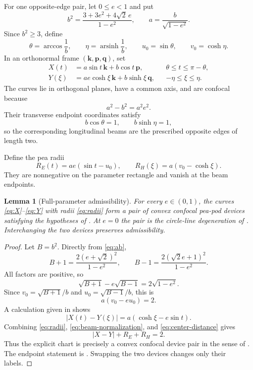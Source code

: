 \documentclass[11pt]{article}
\numberwithin{equation}{section}
\newtheorem{lemma}[theorem]{Lemma}
\theoremstyle{remark}
\newcommand{\arsinh}{\operatorname{arsinh}}
\begin{document}
For one opposite-edge pair, let \(0\le e<1\) and put
\begin{equation}
  b^2=\frac{3+3e^2+4\sqrt2\,e}{1-e^2},
  \qquad
  a=\frac b{\sqrt{1-e^2}}.
  \label{eq:ab}
\end{equation}
Since \(b^2\ge3\), define
\[
  \theta=\arccos\frac1b,
  \qquad
  \eta=\arsinh\frac1b,
  \qquad
  u_0=\sin\theta,
  \qquad
  v_0=\cosh\eta.
\]
In an orthonormal frame \((\mathbf k,\mathbf p,\mathbf q)\), set
\begin{align}
  X(t)&=a\sin t\,\mathbf k+b\cos t\,\mathbf p,
  &&\theta\le t\le\pi-\theta,\label{eq:X}\\
  Y(\xi)&=ae\cosh\xi\,\mathbf k+b\sinh\xi\,\mathbf q,
  &&-\eta\le\xi\le\eta.\label{eq:Y}
\end{align}
The curves lie in orthogonal planes, have a common axis, and are confocal because
\[
  a^2-b^2=a^2e^2.
\]
Their transverse endpoint coordinates satisfy
\[
  b\cos\theta=1,
  \qquad
  b\sinh\eta=1,
\]
so the corresponding longitudinal beams are the prescribed opposite edges of length two.

Define the pea radii
\begin{equation}
  R_E(t)=ae(\sin t-u_0),
  \qquad
  R_H(\xi)=a(v_0-\cosh\xi).
  \label{eq:radii}
\end{equation}
They are nonnegative on the parameter rectangle and vanish at the beam endpoints.

\begin{lemma}[Full-parameter admissibility]
\label{lem:admissible}
For every \(e\in(0,1)\), the curves \eqref{eq:X}--\eqref{eq:Y} with radii \eqref{eq:radii} form a pair of convex confocal pea-pod devices satisfying the hypotheses of \cite[Theorem~4.5]{ArelioMontejanoOliveros2023}.  At \(e=0\) the pair is the circle-line degeneration of \cite[Section~5.3]{ArelioMontejanoOliveros2023}.  Interchanging the two devices preserves admissibility.
\end{lemma}

\begin{proof}
Let \(B=b^2\).  Directly from \eqref{eq:ab},
\[
  B+1=\frac{2(e+\sqrt2)^2}{1-e^2},
  \qquad
  B-1=\frac{2(\sqrt2e+1)^2}{1-e^2}.
\]
All factors are positive, so
\[
  \sqrt{B+1}-e\sqrt{B-1}=2\sqrt{1-e^2}.
\]
Since \(v_0=\sqrt{B+1}/b\) and \(u_0=\sqrt{B-1}/b\), this is
\begin{equation}
  a(v_0-eu_0)=2.
  \label{eq:beam-normalization}
\end{equation}
A calculation given in  shows
\begin{equation}
  |X(t)-Y(\xi)|=a(\cosh\xi-e\sin t).
  \label{eq:center-distance}
\end{equation}
Combining \eqref{eq:radii}, \eqref{eq:beam-normalization}, and \eqref{eq:center-distance} gives
\begin{equation}
  |X-Y|+R_E+R_H=2.
  \label{eq:local-width}
\end{equation}
Thus the explicit chart is precisely a convex confocal device pair in the sense of \cite[Definition~3.5 and Theorem~3.3]{ArelioMontejanoOliveros2023}.  The endpoint statement is \cite[Section~5.3]{ArelioMontejanoOliveros2023}.  Swapping the two devices changes only their labels.
\end{proof}
\end{document}
